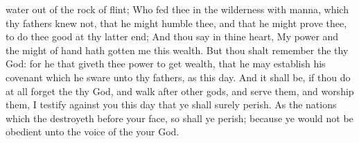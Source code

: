 {water out of the
rock of
flint;
Who
fed thee in the
wilderness with
manna, which thy
fathers
knew not, that he might
humble thee, and that he might
prove thee, to do thee
good at thy latter
end;
And thou
say in thine
heart, My
power and the
might of
{}
hand hath
gotten me this
wealth.
But thou shalt
remember the
{} thy
God: for
{} he that
giveth thee
power to
get
wealth, that he may
establish his
covenant which he
sware unto thy
fathers, as
{} this
day.
And it shall be, if thou do at
all
forget the
{} thy
God, and
walk
after
other
gods, and
serve them, and
worship them, I
testify against you this
day that ye shall
surely
perish.
As the
nations which the
{}
destroyeth before your
face, so shall ye
perish;
because ye would not be
obedient unto the
voice of the
{} your
God.

}

